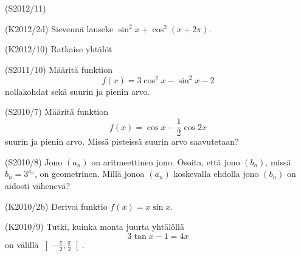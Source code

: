 \begin{tehtava} (S2012/11)
	\begin{alakohdat}
	\end{alakohdat}
\end{tehtava}

\begin{tehtava} (K2012/2d)
	Sievennä lauseke $\sin^2x+\cos^2(x+2\pi)$.
\end{tehtava}

\begin{tehtava} (K2012/10)
	Ratkaise yhtälöt
	\begin{alakohdat}
		\alakohta{$3\tan\frac{x}{2}+3=0$}
		\alakohta{$2\sin^2x+3\cos x-3=0$}
	\end{alakohdat}
\end{tehtava}

\begin{tehtava} (S2011/10)
	Määritä funktion \[f(x)=3\cos^2x-\sin^2x-2\] nollakohdat sekä suurin ja pienin arvo.
\end{tehtava}

\begin{tehtava} (S2010/7)
	Määritä funktion \[f(x)=\cos x-\frac{1}{2}\cos 2x\] suurin ja pienin arvo. Missä pisteissä suurin 
	arvo saavutetaan?
\end{tehtava}

\begin{tehtava} (S2010/8)
	Jono $(a_n)$ on aritmeettinen jono. Osoita, että jono $(b_n)$, missä $b_n=3^{a_n}$, on geometrinen. 
	Millä jonoa $(a_n)$ koskevalla ehdolla jono $(b_n)$ on aidosti vähenevä?
\end{tehtava}

\begin{tehtava} (K2010/2b)
	Derivoi funktio $f(x)=x\sin x$.
\end{tehtava}

\begin{tehtava} (K2010/9)
	Tutki, kuinka monta juurta yhtälöllä \[3\tan x-1=4x\] on välillä 
	$\left]-\frac{\pi}{2},\frac{\pi}{2}\right[$.
\end{tehtava}




